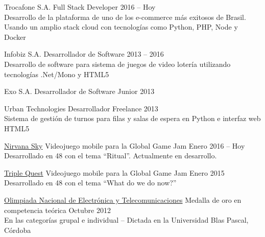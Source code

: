 \documentclass[10pt,a4paper]{article}
\begin{document}
\spacedhrule{0.8em}{-0.4em}


\vspace{0.2em}
\headedsection
    {Trocafone S.A.}
    {\textsc{}}{
    \headedsubsection
        {Full Stack Developer}
        {2016 -- Hoy}
        {\\Desarrollo de la plataforma de uno de los e-commerce más exitosos de Brasil. Usando un amplio stack cloud con tecnologías como Python, PHP, Node y Docker}
}

\vspace{0.2em}
\headedsection
    {Infobiz S.A.}
    {\textsc{}}{
    \headedsubsection
        {Desarrollador de Software}
        {2013 -- 2016}
        {\\Desarrollo de software para sistema de juegos de video lotería utilizando tecnologías .Net/Mono y HTML5}
}

\vspace{0.2em}
\headedsection
    {Exo S.A.}
    {\textsc{}}{
    \headedsubsection
        {Desarrollador de Software Junior}
        {2013}
        {}
}

\vspace{0.2em}
\headedsection
    {Urban Technologies}
    {\textsc{}}{
    \headedsubsection
        {Desarrollador Freelance}
        {2013}
        {\\Sistema de gestión de turnos para filas y salas de espera en Python e interfaz web HTML5}
}

\pagebreak

\spacedhrule{0.8em}{-0.4em}


\vspace{0.2em}
\headedsection
    {\href{http://globalgamejam.org/2016/games/nirvana-sky}{Nirvana Sky}}
    {\textsc{}}{
    \headedsubsection
        {Videojuego mobile para la Global Game Jam}
        {Enero 2016 -- Hoy}
        {\\Desarrollado en 48 con el tema ``Ritual''. Actualmente en desarrollo.}
}

\vspace{0.2em}
\headedsection
    {\href{http://globalgamejam.org/2015/games/triple-quest}{Triple Quest}}
    {\textsc{}}{
    \headedsubsection
        {Videojuego mobile para la Global Game Jam}
        {Enero 2015}
        {\\Desarrollado en 48 con el tema ``What do we do now?''}
}

\vspace{0.2em}
\headedsection
    {\href{}{Olimpiada Nacional de Electrónica y Telecomunicaciones}}
    {\textsc{}}{
    \headedsubsection
        {Medalla de oro en competencia teórica}
        {Octubre 2012}
        {\\En las categorías grupal e individual -- Dictada en la Universidad Blas Pascal, Córdoba}
}
\end{document}
